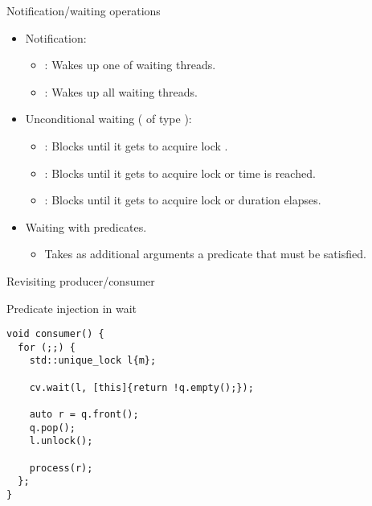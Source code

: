 \begin{frame}{Notification/waiting operations}
\begin{itemize}
  \item Notification:
    \begin{itemize}
      \item {}: Wakes up one of waiting threads.
      \item {}: Wakes up all waiting threads.

    \end{itemize}
  \item Unconditional waiting ( of type ):
    \begin{itemize}
      \item {}: Blocks until it gets to acquire lock .
      \item {}: Blocks until it gets to acquire lock  or time  is reached.
      \item {}: Blocks until it gets to acquire lock  or duration  elapses.
    \end{itemize}
  \item Waiting with predicates.
    \begin{itemize}
      \item Takes as additional arguments a predicate that must be satisfied.
    \end{itemize}
\end{itemize}
\end{frame}

\begin{frame}[fragile]{Revisiting producer/consumer}
\begin{block}{Predicate injection in wait}
\begin{lstlisting}
void consumer() {
  for (;;) {
    std::unique_lock l{m};

    cv.wait(l, [this]{return !q.empty();});

    auto r = q.front();
    q.pop();
    l.unlock();
   
    process(r);
  };
}
\end{lstlisting}
\end{block}
\end{frame}


